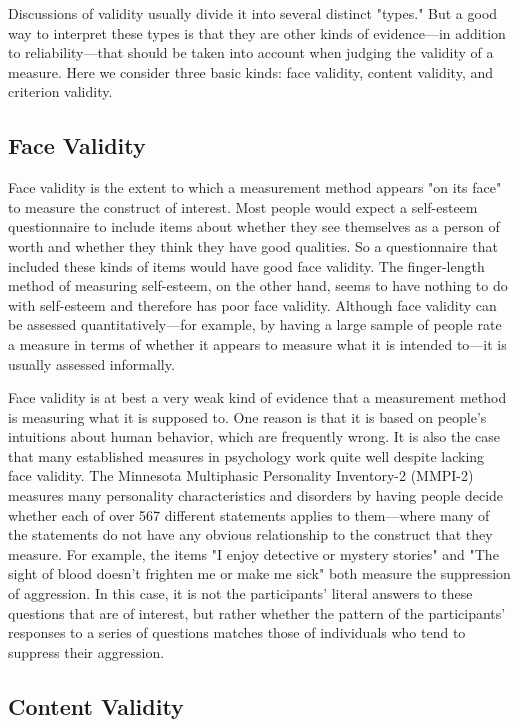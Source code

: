 Discussions of validity usually divide it into several distinct "types." But a good way to interpret these types is that they are other kinds of evidence—in addition to reliability—that should be taken into account when judging the validity of a measure. Here we consider three basic kinds: face validity, content validity, and criterion validity.

\subsection{Face Validity}

Face validity is the extent to which a measurement method appears "on its face" to measure the construct of interest. Most people would expect a self-esteem questionnaire to include items about whether they see themselves as a person of worth and whether they think they have good qualities. So a questionnaire that included these kinds of items would have good face validity. The finger-length method of measuring self-esteem, on the other hand, seems to have nothing to do with self-esteem and therefore has poor face validity. Although face validity can be assessed quantitatively—for example, by having a large sample of people rate a measure in terms of whether it appears to measure what it is intended to—it is usually assessed informally.

Face validity is at best a very weak kind of evidence that a measurement method is measuring what it is supposed to. One reason is that it is based on people's intuitions about human behavior, which are frequently wrong. It is also the case that many established measures in psychology work quite well despite lacking face validity. The Minnesota Multiphasic Personality Inventory-2 (MMPI-2) measures many personality characteristics and disorders by having people decide whether each of over 567 different statements applies to them—where many of the statements do not have any obvious relationship to the construct that they measure. For example, the items "I enjoy detective or mystery stories" and "The sight of blood doesn't frighten me or make me sick" both measure the suppression of aggression. In this case, it is not the participants' literal answers to these questions that are of interest, but rather whether the pattern of the participants' responses to a series of questions matches those of individuals who tend to suppress their aggression.

\subsection{Content Validity}

